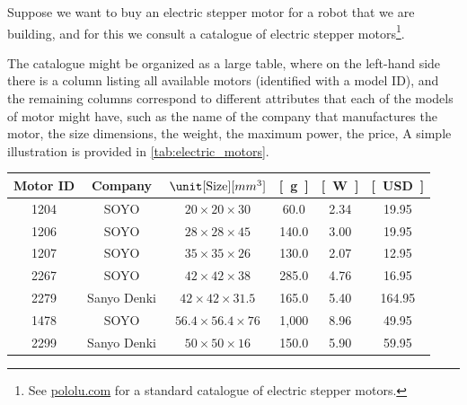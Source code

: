 \begin{example}[Relabelling]
    Suppose we want to buy an electric stepper motor for a robot that we are building, and for this we consult a catalogue of electric stepper motors\footnote{See \href{https://www.pololu.com/category/87/stepper-motors}{pololu.com} for a standard catalogue of electric stepper motors.
    }.

    The catalogue might be organized as a large table, where on the left-hand side there is a column listing all available motors (identified with a model ID), and the remaining columns correspond to different attributes that each of the models of motor might have, such as the name of the company that manufactures the motor, the size dimensions, the weight, the maximum power, the price, \etc
    A simple illustration is provided in \cref{tab:electric_motors}.

    \begin{table}[h]
        \centering
        \begin{tabular}{c|c|c|c|c|c}
            Motor ID      & Company              & $\unit[\text{Size}]{[mm^3]}$  & \unit[Weight]{[g]} & \unit[Max Power]{[W]}
                          & \unit[Cost]{[USD]} \\
            \hline
            \textsf{1204} & \textsf{SOYO}        & $20 \times 20 \times 30$      & 60.0               & 2.34                  & 19.95 \\
            \textsf{1206} & \textsf{SOYO}        & $28 \times 28 \times 45$      & 140.0              & 3.00                  & 19.95 \\
            \textsf{1207} & \textsf{SOYO}        & $35 \times 35\times 26$       & 130.0              & 2.07                  & 12.95 \\
            \textsf{2267} & \textsf{SOYO}        & $42 \times 42 \times38$       & 285.0              & 4.76                  & 16.95 \\
            \textsf{2279} & \textsf{Sanyo Denki} & $42 \times 42 \times 31.5$    & 165.0              & 5.40                  & 164.95 \\
            \textsf{1478} & \textsf{SOYO}        & $56.4 \times 56.4 \times 76 $ & 1,000              & 8.96                  & 49.95 \\
            \textsf{2299} & \textsf{Sanyo Denki} & $50 \times 50 \times 16$      & 150.0              & 5.90                  & 59.95
        \end{tabular}


\end{table}
\end{example}
